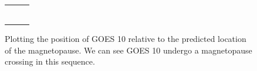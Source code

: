 \documentclass[12pt, letterpaper]{article}
\begin{document}
\begin{figure}
\begin{tabularx}{\linewidth}{@{}cXX@{}}
\begin{tabular}{cc}
\end{tabular}
\end{tabularx}
\caption{Plotting the position of GOES 10 relative to the predicted location of the magnetopause. We can see GOES 10 undergo a magnetopause crossing in this sequence. }
\label{fig:movie}
\end{figure}

\newpage

\end{document}
